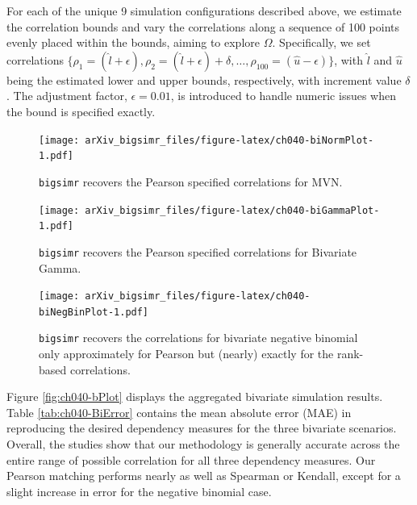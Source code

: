\documentclass{article}
\begin{document}
For each of the unique 9 simulation configurations described above, we
estimate the correlation bounds and vary the correlations along a
sequence of 100 points evenly placed within the bounds, aiming to
explore \(\Omega\). Specifically, we set correlations
\(\{ \rho_1 = ( \hat{l} + \epsilon), \rho_2 = (\hat{l} + \epsilon) + \delta, \ldots, \rho_{100} = (\hat{u} - \epsilon) \}\),
with \(\hat{l}\) and \(\hat{u}\) being the estimated lower and upper
bounds, respectively, with increment value \(\delta\). The adjustment
factor, \(\epsilon=0.01\), is introduced to handle numeric issues when
the bound is specified exactly.

\begin{figure}
\centering
\texttt{[image: arXiv\_bigsimr\_files/figure-latex/ch040-biNormPlot-1.pdf]}
\caption{\label{fig:ch040-biNormPlot}\texttt{bigsimr} recovers the
Pearson specified correlations for MVN.}
\end{figure}

\begin{figure}
\centering
\texttt{[image: arXiv\_bigsimr\_files/figure-latex/ch040-biGammaPlot-1.pdf]}
\caption{\label{fig:ch040-biGammaPlot}\texttt{bigsimr} recovers the
Pearson specified correlations for Bivariate Gamma.}
\end{figure}

\begin{figure}
\centering
\texttt{[image: arXiv\_bigsimr\_files/figure-latex/ch040-biNegBinPlot-1.pdf]}
\caption{\label{fig:ch040-biNegBinPlot}\texttt{bigsimr} recovers the
correlations for bivariate negative binomial only approximately for
Pearson but (nearly) exactly for the rank-based correlations.}
\end{figure}

Figure \ref{fig:ch040-bPlot} displays the aggregated bivariate
simulation results. Table \ref{tab:ch040-BiError} contains the mean
absolute error (MAE) in reproducing the desired dependency measures for
the three bivariate scenarios. Overall, the studies show that our
methodology is generally accurate across the entire range of possible
correlation for all three dependency measures. Our Pearson matching
performs nearly as well as Spearman or Kendall, except for a slight
increase in error for the negative binomial case.
\end{document}
